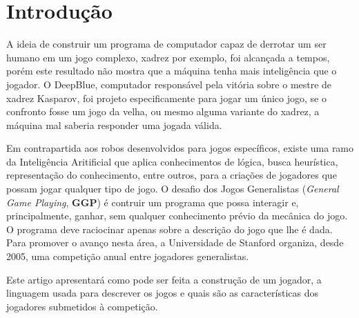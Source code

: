 \section{Introdução}
A ideia de construir um programa de computador capaz de derrotar um ser humano 
em um jogo complexo, xadrez por exemplo, foi alcançada a tempos, porém este 
resultado não mostra que a máquina tenha mais inteligência que o jogador. O 
DeepBlue, computador responsável pela vitória sobre o mestre de xadrez Kasparov, 
foi projeto especificamente para jogar um único jogo, se o confronto fosse um 
jogo da velha, ou mesmo alguma variante do xadrez, a máquina mal saberia 
responder uma jogada válida. 

Em contrapartida aos robos desenvolvidos para jogos específicos, existe uma ramo
da Inteligência Aritificial que aplica conhecimentos de lógica, busca 
heurística, representação do conhecimento, entre outros, para a criações de
jogadores que possam jogar qualquer tipo de jogo. 
O desafio dos Jogos Generalistas ({\it General Game Playing}, {\bf GGP}) é
contruir um programa que possa interagir e, principalmente, ganhar, sem qualquer
conhecimento prévio da mecânica do jogo. O programa deve raciocinar apenas sobre
a descrição do jogo que lhe é dada. Para promover o avanço nesta área, a
Universidade de Stanford organiza, desde 2005, uma competição anual entre
jogadores generalistas. 

Este artigo apresentará como pode ser feita a construção de um jogador, a
linguagem usada para descrever os jogos e quais são as características dos
jogadores submetidos à competição. 

